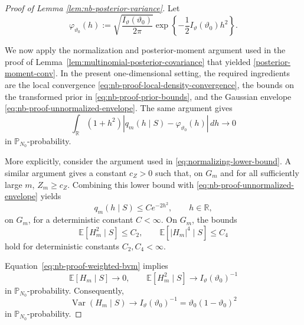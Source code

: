 \documentclass{article}
\theoremstyle{named}
\theoremstyle{named1}
\theoremstyle{plain}
\theoremstyle{remark}
\begin{document}
\begin{proof}[Proof of Lemma \ref{lem:nb-posterior-variance}]
Let
\[
    \varphi_{\vartheta_0}(h)
    :=
    \sqrt{\frac{I_\vartheta(\vartheta_0)}{2\pi}}
    \exp\left\{
        -\frac12 I_\vartheta(\vartheta_0)h^2
    \right\}.
\]

We now apply the normalization and posterior-moment argument used in
the proof of Lemma~\ref{lem:multinomial-posterior-covariance} that yielded \eqref{posterior-moment-conv}. In the present one-dimensional
setting, the required ingredients are the local convergence
\eqref{eq:nb-proof-local-density-convergence}, the bounds on the
transformed prior in \eqref{eq:nb-proof-prior-bounds}, and the
Gaussian envelope
\eqref{eq:nb-proof-unnormalized-envelope}. The same argument gives
\begin{equation}
    \int_{\mathbb R}
    (1+h^2)
    \left|
        q_m(h\mid S)-\varphi_{\vartheta_0}(h)
    \right|\,dh
    \rightarrow0
    \label{eq:nb-proof-weighted-bvm}
\end{equation}
in \(\mathbb P_{N_0}\)-probability.

More explicitly, consider the argument used in \eqref{eq:normalizing-lower-bound}. A similar argument gives a
constant \(c_Z>0\) such that, on \(G_m\) and for all sufficiently
large \(m\),
$Z_m\geq c_Z.$
Combining this lower bound with
\eqref{eq:nb-proof-unnormalized-envelope} yields
\begin{equation}
    q_m(h\mid S)
    \leq
    C e^{-2h^2},
    \qquad h\in\mathbb R,
    \label{eq:nb-proof-posterior-envelope}
\end{equation}
on \(G_m\), for a deterministic constant \(C<\infty\).
On $G_m$, the bounds
\begin{equation}
    \mathbb E\!\left[
        H_m^2\mid S
    \right]
    \leq C_2,
    \qquad
    \mathbb E\!\left[
        |H_m|^4\mid S
    \right]
    \leq C_4
    \label{eq:nb-proof-posterior-moment-bounds}
\end{equation}
hold for deterministic constants \(C_2,C_4<\infty\).

Equation~\eqref{eq:nb-proof-weighted-bvm} implies
\[
    \mathbb E[H_m\mid S]\rightarrow0,
\qquad
    \mathbb E[H_m^2\mid S]
    \rightarrow
    I_\vartheta(\vartheta_0)^{-1}
\]
in \(\mathbb P_{N_0}\)-probability. Consequently,
\begin{equation}
    \operatorname{Var}(H_m\mid S)
    \rightarrow
    I_\vartheta(\vartheta_0)^{-1}
    =
    \vartheta_0(1-\vartheta_0)^2
    \label{eq:nb-proof-posterior-variance-probability}
\end{equation}
in \(\mathbb P_{N_0}\)-probability.


\end{proof}
\end{document}
